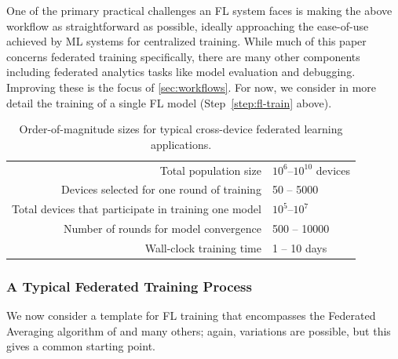 \documentclass[11pt]{article}
\begin{document}
One of the primary practical challenges an FL system faces is making the above workflow as straightforward as possible, ideally approaching the ease-of-use achieved by ML systems for centralized training. While much of this paper concerns federated training specifically, there are many other components including federated analytics tasks like model evaluation and debugging. Improving these is the focus of \cref{sec:workflows}. For now, we consider in more detail the training of a single FL model (Step~\ref{step:fl-train} above).



\begin{table}
\centering
\renewcommand{\arraystretch}{1.2}
\begin{tabular}{rl}    
\toprule
Total population size                           & $10^6$--$10^{10}$ devices \\
Devices selected for one round of training      & 50 -- 5000 \\
Total devices that participate in training one model  & $10^5$--$10^7$ \\
Number of rounds for model convergence          & 500 -- 10000 \\
Wall-clock training time                        & 1 -- 10 days \\
\bottomrule
\end{tabular}
\caption{Order-of-magnitude sizes for typical cross-device federated learning applications.}
\label{tab:sizes}
\end{table}

\subsubsection{A Typical Federated Training Process}\label{sec:typical-training}
We now consider a template for FL training that encompasses the Federated Averaging algorithm of \citet{mcmahan17fedavg} and many others; again, variations are possible, but this gives a common starting point. 

\end{document}
